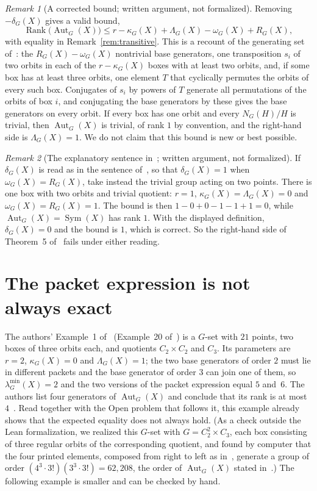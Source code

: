 \documentclass[11pt]{article}
\theoremstyle{remark}
\newtheorem{remark}{Remark}
\newcommand{\Rank}{\operatorname{Rank}}
\newcommand{\Aut}{\operatorname{Aut}}
\newcommand{\Sym}{\operatorname{Sym}}
\newcommand{\lmin}{\lambda^{\min}}
\begin{document}
\begin{remark}[A corrected bound; written argument, not formalized]
\label{rem:repair}
Removing $-\delta_G(X)$ gives a valid bound,
\[
\Rank\bigl(\Aut_G(X)\bigr)\le r-\kappa_G(X)+\Lambda_G(X)-\omega_G(X)+R_G(X),
\]
with equality in Remark~\ref{rem:transitive}. This is a recount of the
generating set of~\cite[Theorems~5 and~6]{lrr}: the $R_G(X)-\omega_G(X)$
nontrivial base generators, one transposition $s_i$ of two orbits in each of
the $r-\kappa_G(X)$ boxes with at least two orbits, and, if some box has at
least three orbits, one element $T$ that cyclically permutes the orbits of
every such box. Conjugates of $s_i$ by powers of $T$ generate all
permutations of the orbits of box $i$, and conjugating the base generators by
these gives the base generators on every orbit. If every box has one orbit and every
$N_G(H)/H$ is trivial, then $\Aut_G(X)$ is trivial, of rank $1$ by
convention, and the right-hand side is $\Lambda_G(X)=1$. We do not claim that
this bound is new or best possible.
\end{remark}

\begin{remark}[The explanatory sentence in~\cite{rlr}; written argument, not
formalized]\label{rem:delta}
If $\delta_G(X)$ is read as in the sentence of~\cite[p.~6]{rlr}, so that
$\delta_G(X)=1$ when $\omega_G(X)=R_G(X)$, take instead the trivial group
acting on two points. There is one box with two orbits and trivial quotient:
$r=1$, $\kappa_G(X)=\Lambda_G(X)=0$ and $\omega_G(X)=R_G(X)=1$. The bound is
then $1-0+0-1-1+1=0$, while $\Aut_G(X)=\Sym(X)$ has rank $1$. With the
displayed definition, $\delta_G(X)=0$ and the bound is $1$, which is correct.
So the right-hand side of Theorem~5 of~\cite{rlr} fails under either reading.
\end{remark}

\section{The packet expression is not always exact}\label{sec:five}

The authors' Example~1 of~\cite{lrr} (Example~20 of~\cite{rlr}) is a $G$-set
with $21$ points, two boxes of three orbits each, and quotients
$C_2\times C_2$ and $C_3$. Its parameters are $r=2$, $\kappa_G(X)=0$ and
$\Lambda_G(X)=1$; the two base generators of order $2$ must lie in different
packets and the base generator of order $3$ can join one of them, so
$\lmin_G(X)=2$ and the two versions of the packet expression equal $5$
and~$6$. The authors list four generators of $\Aut_G(X)$ and conclude that its
rank is at most $4$~\cite[p.~20]{lrr}. Read together with the Open problem
that follows it, this example already shows that the expected equality does
not always hold. (As a check outside the Lean formalization, we realized this
$G$-set with $G=C_2^2\times C_3$, each box consisting of three regular orbits
of the corresponding quotient, and found by computer that the four printed
elements, composed from right to left as in~\cite[Lemma~3]{lrr}, generate a
group of order $(4^3\cdot3!)(3^3\cdot3!)=62{,}208$, the
order of $\Aut_G(X)$ stated in~\cite{lrr}.) The following example is smaller
and can be checked by hand.
\end{document}

